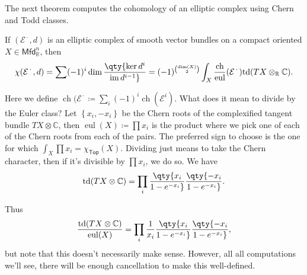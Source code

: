 \begin{remark}

The next theorem computes the cohomology of an elliptic complex using
Chern and Todd classes.

\end{remark}

\begin{theorem}

If \(( {\mathcal{E}}^{{\,\cdot\,}}, d)\) is an elliptic complex of
smooth vector bundles on a compact oriented
\(X\in {\mathsf{Mfd}}^n_{\mathbb{R}}\), then
\begin{align*}
\chi({ \mathcal{E} }^{{\,\cdot\,}}, d) = \sum (-1)^i \dim \qty{\ker d^i \over \operatorname{im}d^{i-1} } = 
(-1)^{\dim(X) \choose 2}
\int_X {\operatorname{ch}\over {\operatorname{eul}}}( {\mathcal{E}}^{{\,\cdot\,}} ) \mathrm{td}(TX \otimes_{\mathbb{R}}{\mathbb{C}})
.\end{align*}

\end{theorem}

\begin{remark}

Here we define
\(\operatorname{ch}( {\mathcal{E}}^{{\,\cdot\,}} \coloneqq\sum_i (-1)^i \operatorname{ch}( \mathcal{E}^i )\).
What does it mean to divide by the Euler class? Let
\(\left\{{ x_i, -x_i }\right\}\) be the Chern roots of the complexified
tangent bundle \(TX\otimes{\mathbb{C}}\), then
\({\operatorname{eul}}(X) \coloneqq\prod x_i\) is the product where we
pick one of each of the Chern roots from each of the pairs. The
preferred sign to choose is the one for which
\(\int_X \prod x_i = \chi_{\mathsf{Top}}(X)\). Dividing just means to
take the Chern character, then if it's divisible by \(\prod x_i\), we do
so. We have
\begin{align*}
\mathrm{td}(TX\otimes{\mathbb{C}}) = \prod_i 
\qty{x_i \over 1 - e^{-x_i}} 
\qty{-x_i \over 1 - e^{-x_i}} 
.\end{align*}

Thus
\begin{align*}
{\mathrm{td}(TX\otimes{\mathbb{C}}) \over {\operatorname{eul}}(X) } = 
\prod_i {1\over x_i}
\qty{x_i \over 1 - e^{-x_i}} 
\qty{-x_i \over 1 - e^{-x_i}} 
,\end{align*}
but note that this doesn't necessarily make sense. However, all all
computations we'll see, there will be enough cancellation to make this
well-defined.

\end{remark}

